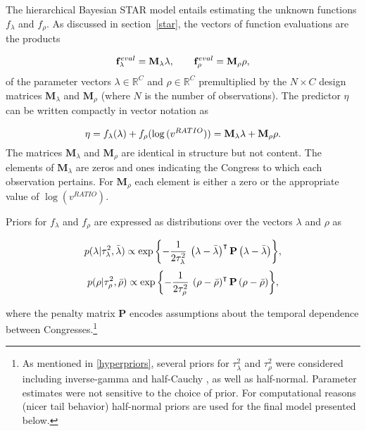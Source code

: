The hierarchical Bayesian STAR model entails estimating the unknown functions $f_\lambda$ and $f_\rho$. As discussed in section~\ref{star}, the vectors of function evaluations are the products 

\begin{equation*}
\mathbf{f}^{eval}_\lambda = \mathbf{M}_\lambda \lambda, 
\qquad 
\mathbf{f}^{eval}_\rho =  \mathbf{M}_\rho \rho, 
\end{equation*}
%
\noindent of the parameter vectors $\lambda \in \mathbb{R}^C$ and $\rho \in \mathbb{R}^C$ premultiplied by the  $N \times C$ design matrices  $\mathbf{M}_\lambda$ and  $\mathbf{M}_\rho$ (where $N$ is the number of observations). The predictor $\eta$ can be written compactly in vector notation as 

\begin{equation*}
 \eta = f_\lambda(\lambda) +  f_\rho(\log{(v^{RATIO})}) = \mathbf{M}_\lambda \lambda  + \mathbf{M}_\rho \rho.
\end{equation*}
\indent The matrices $\mathbf{M}_\lambda$ and $\mathbf{M}_\rho$ are identical in structure but not content. The elements of $\mathbf{M}_\lambda$ are zeros and ones indicating the Congress to which each observation pertains. For $\mathbf{M}_\rho$ each element is either a zero or the appropriate value of $\log{(v^{RATIO})}$. 


Priors for $f_{\lambda}$ and $f_{\rho}$ are expressed as distributions over the vectors $\lambda$ and $\rho$ as 

\begin{equation*}
p(\lambda | \tau_\lambda^2, \bar{\lambda}) \propto \exp{\left\{-\frac{1}{2\tau_\lambda^2} \: \left(\lambda - \bar{\lambda}\right)^\intercal  \mathbf{P}   \left(\lambda - \bar{\lambda}\right) \right\}}, 
\end{equation*}
\begin{equation*}
p(\rho | \tau_\rho^2, \bar{\rho}) \propto \exp{\left\{-\frac{1}{2\tau_\rho^2} \: \left(\rho - \bar{\rho}\right)^\intercal  \mathbf{P} \left(\rho-\bar{\rho}\right) \right\}},
\end{equation*}

\noindent where the penalty matrix $\mathbf{P}$ encodes assumptions about the temporal dependence between Congresses.\footnote{As mentioned in \ref{hyperpriors}, several priors for $\tau^2_\lambda$ and $\tau^2_\rho$ were considered including inverse-gamma  and half-Cauchy , as well as half-normal. Parameter estimates were not sensitive to the choice of prior. For computational reasons (nicer tail behavior) half-normal priors are used for the final model presented below.}

